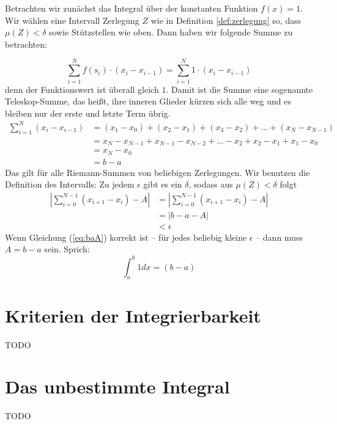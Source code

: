 Betrachten wir zunächst das Integral über der konstanten Funktion $f(x)=1$. Wir wählen eine Intervall Zerlegung $Z$ wie in Definition \ref{def:zerlegung} so, dass $\mu(Z)<\delta$ sowie Stützstellen wie oben. Dann haben wir folgende Summe zu betrachten:

\begin{equation}
\sum_{i=1}^{N} f(s_i)\cdot (x_{i}-x_{i-1}) = \sum_{i=1}^{N} 1\cdot (x_{i}-x_{i-1})
\end{equation}
denn der Funktionswert ist überall gleich $1$. Damit ist die Summe eine sogenannte Teleskop-Summe, das heißt, ihre inneren Glieder kürzen sich alle weg und es bleiben nur der erste und letzte Term übrig.
\begin{equation}
\begin{split}
\sum_{i=1}^{N} (x_{i}-x_{i-1}) &=(x_1-x_0)+(x_2-x_1)+(x_3-x_2)+\dots +(x_N-x_{N-1}) \\
&= x_N-x_{N-1}+x_{N-1}-x_{N-2}+ \dots -x_2+x_2-x_1+x_1-x_0 \\
&= x_N-x_0\\
&=b-a
\end{split}
\end{equation}
Das gilt für alle Riemann-Summen von beliebigen Zerlegungen. Wir benutzen die Definition des Intervalls: Zu jedem $\epsilon$ gibt es ein $\delta$, sodass aus $\mu(Z)<\delta$ folgt
\begin{equation}\label{eq:baA}
\begin{split}
\left| \sum_{i=0}^{N-1} (x_{i+1}-x_i) -A \right| &= \left| \sum_{i=0}^{N-1} (x_{i+1}-x_i) -A \right| \\ 
&=\left| b-a - A \right| \\
&< \epsilon
\end{split}
\end{equation}
Wenn Gleichung (\ref{eq:baA}) korrekt ist -- für jedes beliebig kleine $\epsilon$ -- dann muss $A=b-a$ sein. Sprich:
\begin{equation}
\int_a^b 1 dx = (b-a)
\end{equation}

\section{Kriterien der Integrierbarkeit}
TODO 

\section{Das unbestimmte Integral}
TODO

